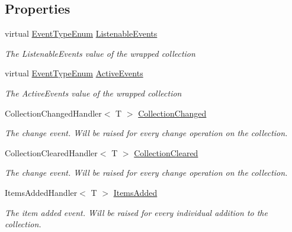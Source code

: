 \subsection*{Properties}
\begin{DoxyCompactItemize}
\item 
virtual \hyperlink{namespace_c5_a9143bfd561fffa025d21561674758008}{Event\+Type\+Enum} \hyperlink{class_c5_1_1_guarded_collection_value_ae25ccc848da34d751250986e82f56faa}{Listenable\+Events}
\begin{DoxyCompactList}\small\item\em The Listenable\+Events value of the wrapped collection \end{DoxyCompactList}\item 
virtual \hyperlink{namespace_c5_a9143bfd561fffa025d21561674758008}{Event\+Type\+Enum} \hyperlink{class_c5_1_1_guarded_collection_value_af2f6e3f9dac82651c997ea9b94fffe46}{Active\+Events}
\begin{DoxyCompactList}\small\item\em The Active\+Events value of the wrapped collection \end{DoxyCompactList}\item 
Collection\+Changed\+Handler$<$ T $>$ \hyperlink{class_c5_1_1_guarded_collection_value_a38a7720b5a831f9db428150c9a919705}{Collection\+Changed}
\begin{DoxyCompactList}\small\item\em The change event. Will be raised for every change operation on the collection. \end{DoxyCompactList}\item 
Collection\+Cleared\+Handler$<$ T $>$ \hyperlink{class_c5_1_1_guarded_collection_value_a380426d2c8a2a3b02ec8f9ef7deafdc3}{Collection\+Cleared}
\begin{DoxyCompactList}\small\item\em The change event. Will be raised for every change operation on the collection. \end{DoxyCompactList}\item 
Items\+Added\+Handler$<$ T $>$ \hyperlink{class_c5_1_1_guarded_collection_value_aeb91b9e7ca3dfac470295adc96ab1dab}{Items\+Added}
\begin{DoxyCompactList}\small\item\em The item added event. Will be raised for every individual addition to the collection. \end{DoxyCompactList}\item 

\end{DoxyCompactItemize}
